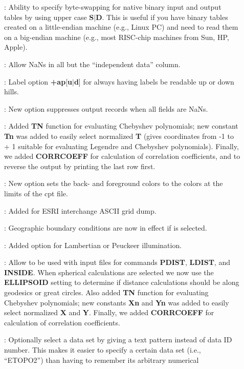 \begin{description}
\item []: Ability to specify byte-swapping for native binary input and output tables by using upper
case {\bf S}$|${\bf D}.  This is useful if you have binary tables created on a little-endian machine (e.g.,
Linux PC) and need to read them on a big-endian machine (e.g., most RISC-chip machines from Sun, HP, Apple).
\item []: Allow NaNs in all but the ``independent data'' column.
\item []: Label option {\bf +ap}[{\bf u}$|${\bf d}] for always having labels be readable up or down hills.
\item []: New  option suppresses output records when all fields are NaNs.
\item []: Added {\bf TN} function
for evaluating Chebyshev polynomials; new constant {\bf Tn} was added to easily select normalized {\bf T}
(gives coordinates from -1 to + 1 suitable for evaluating Legendre and Chebyshev polynomials).
Finally, we added {\bf CORRCOEFF} for calculation of correlation coefficients, and  to reverse
the output by printing the last row first.
\item []: New option  sets the back- and foreground colors to the colors at the limits of the cpt file.
\item []: Added  for ESRI interchange ASCII grid dump.
\item []: Geographic boundary conditions are now in effect if  is selected.
\item []: Added option  for Lambertian or Peuckeer illumination.
\item []: Allow  to be used with input files for commands {\bf PDIST}, {\bf LDIST},
and {\bf INSIDE}.  When spherical calculations are selected we now use the {\bf ELLIPSOID} setting to
determine if distance calculations should be along geodesics or great circles.  Also added {\bf TN} function
for evaluating Chebyshev polynomials; new constants {\bf Xn} and {\bf Yn} was added to easily select
normalized {\bf X} and {\bf Y}.  Finally, we added {\bf CORRCOEFF} for calculation of correlation coefficients.
\item []: Optionally select a data set by giving a text pattern instead of data ID number.
This makes it easier to specify a certain data set (i.e., ``ETOPO2'') than having to remember its arbitrary numerical

\end{description}
